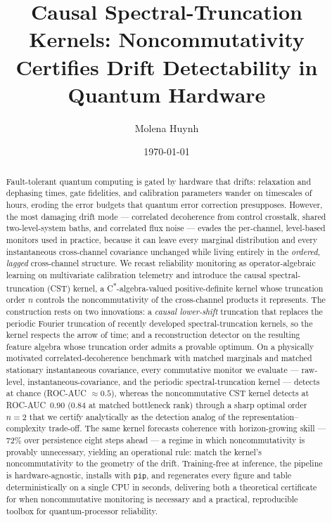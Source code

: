 \documentclass[
  aps,
  prresearch,
  reprint,
  amsmath,
  amssymb,
  nofootinbib,
  floatfix,
]{revtex4-2}
\begin{document}
\title{Causal Spectral-Truncation Kernels: Noncommutativity Certifies Drift
Detectability in Quantum Hardware}

\author{Molena Huynh}

\date{\today}

\begin{abstract}
Fault-tolerant quantum computing is gated by hardware that drifts: relaxation and
dephasing times, gate fidelities, and calibration parameters wander on timescales
of hours, eroding the error budgets that quantum error correction presupposes.
However, the most damaging drift mode --- correlated decoherence from control
crosstalk, shared two-level-system baths, and correlated flux noise --- evades the
per-channel, level-based monitors used in practice, because it can leave every
marginal distribution and every instantaneous cross-channel covariance unchanged
while living entirely in the \emph{ordered, lagged} cross-channel structure. We
recast reliability monitoring as operator-algebraic learning on multivariate
calibration telemetry and introduce the causal spectral-truncation (CST) kernel, a
C\textsuperscript{$\ast$}-algebra-valued positive-definite kernel whose truncation
order $n$ controls the noncommutativity of the cross-channel products it
represents. The construction rests on two innovations: a \emph{causal lower-shift}
truncation that replaces the periodic Fourier truncation of recently developed
spectral-truncation kernels, so the kernel respects the arrow of time; and a
reconstruction detector on the resulting feature algebra whose truncation order
admits a provable optimum. On a physically motivated
correlated-decoherence benchmark with matched marginals and matched stationary
instantaneous covariance, every commutative monitor we evaluate --- raw-level,
instantaneous-covariance, and the periodic spectral-truncation kernel --- detects
at chance (ROC-AUC $\approx0.5$), whereas the noncommutative CST kernel detects at
ROC-AUC~$0.90$ ($0.84$ at matched bottleneck rank) through a sharp optimal order
$n{=}2$ that we certify analytically as the detection analog of the
representation--complexity trade-off. The same kernel forecasts coherence with
horizon-growing skill --- $72\%$ over persistence eight steps ahead --- a regime in
which noncommutativity is provably unnecessary, yielding an operational rule:
match the kernel's noncommutativity to the geometry of the drift. Training-free at
inference, the pipeline is hardware-agnostic, installs with \texttt{pip}, and
regenerates every figure and table deterministically on a single CPU in seconds,
delivering both a theoretical certificate for when noncommutative monitoring is
necessary and a practical, reproducible toolbox for quantum-processor reliability.
\end{abstract}
\end{document}
